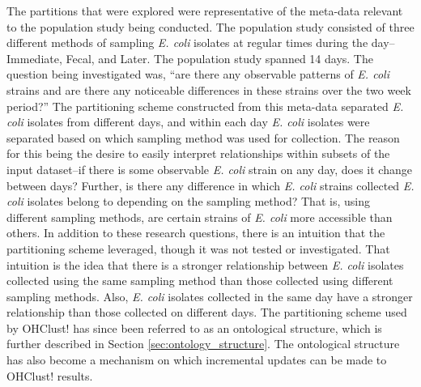 \documentclass[12pt]{ucthesis}
\begin{document}
      The partitions that were explored were representative of the meta-data
      relevant to the population study being conducted. The population study
      consisted of three different methods of sampling \textit{E. coli}
      isolates at regular times during the day--\textnormal{I}mmediate,
      \textnormal{F}ecal, and \textnormal{L}ater. The population study spanned
      14 days. The question being investigated was, ``are there any observable
      patterns of \textit{E. coli} strains and are there any noticeable
      differences in these strains over the two week period?'' The partitioning
      scheme constructed from this meta-data separated \textit{E. coli}
      isolates from different days, and within each day \textit{E. coli}
      isolates were separated based on which sampling method was used for
      collection. The reason for this being the desire to easily interpret
      relationships within subsets of the input dataset--if there is some
      observable \textit{E. coli} strain on any day, does it change between
      days? Further, is there any difference in which \textit{E. coli} strains
      collected \textit{E. coli} isolates belong to depending on the sampling
      method? That is, using different sampling methods, are certain strains of
      \textit{E. coli} more accessible than others. In addition to these
      research questions, there is an intuition that the partitioning scheme
      leveraged, though it was not tested or investigated. That intuition is
      the idea that there is a stronger relationship between \textit{E. coli}
      isolates collected using the same sampling method than those collected
      using different sampling methods. Also, \textit{E. coli} isolates
      collected in the same day have a stronger relationship than those
      collected on different days. The partitioning scheme used by
      \textsf{OHClust!} has since been referred to as an ontological structure,
      which is further described in Section \ref{sec:ontology_structure}. The
      ontological structure has also become a mechanism on which incremental
      updates can be made to \textsf{OHClust!} results.
\end{document}
